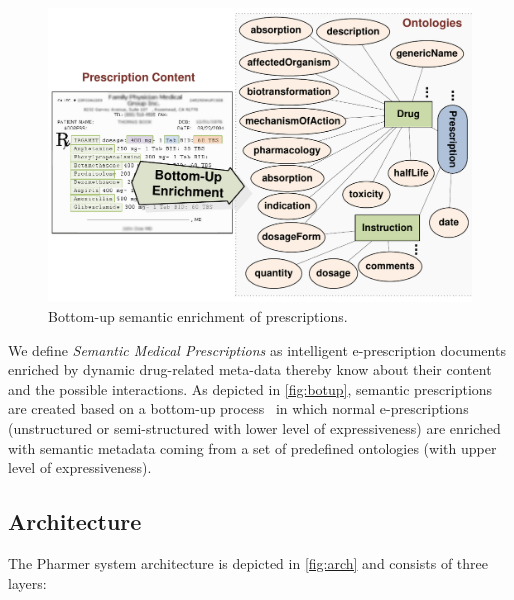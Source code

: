 \documentclass[journal]{IEEEtran}
\begin{document}
\begin{figure}[tb]
	\centering
		\includegraphics[width=1.0\columnwidth]{images/approaches.pdf}
	\caption{Bottom-up semantic enrichment of prescriptions.}
	\label{fig:botup}
\end{figure}

We define \emph{Semantic Medical Prescriptions} as intelligent e-prescription documents enriched by dynamic drug-related meta-data thereby know about their content and the possible interactions.
As depicted in \autoref{fig:botup}, semantic prescriptions are created based on a bottom-up process~\cite{khalili2012} in which normal e-prescriptions (unstructured or semi-structured with lower level of expressiveness) are enriched with semantic metadata coming from a set of predefined ontologies (with upper level of expressiveness).

\subsection{Architecture}

The Pharmer system architecture is depicted in \autoref{fig:arch} and consists of three layers:\\
\end{document}
